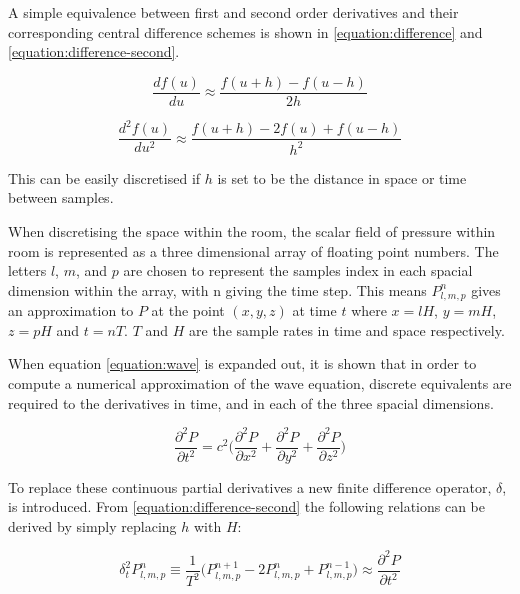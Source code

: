 \documentclass[12pt,a4paper]{report}
\begin{document}
A simple equivalence between first and second order derivatives and their corresponding central difference schemes is shown in \ref{equation:difference} and \ref{equation:difference-second}.

\begin{equation}
\label{equation:difference}
\frac{df(u)}{du} \approx \frac{f(u+h) - f(u-h)}{2h}
\end{equation}

\begin{equation}
\label{equation:difference-second}
\frac{d^{2}f(u)}{du^{2}} \approx \frac{f(u+h) - 2f(u) + f(u-h)}{h^{2}}
\end{equation}

This can be easily discretised if $h$ is set to be the distance in space or time between samples.

When discretising the space within the room, the scalar field of pressure within room is represented as a three dimensional array of floating point numbers. The letters $l$, $m$, and $p$ are chosen to represent the samples index in each spacial dimension within the array, with n giving the time step. This means $P_{l,m,p}^{n}$ gives an approximation to $P$ at the point $(x,y,z)$ at time $t$ where $x = lH$, $y = mH$, $z = pH$ and $t = nT$. $T$ and $H$ are the sample rates in time and space respectively.

When equation \ref{equation:wave} is expanded out, it is shown that in order to compute a numerical approximation of the wave equation, discrete equivalents are required to the derivatives in time, and in each of the three spacial dimensions.

\begin{equation}
\label{equation:wave-expanded}
\frac{{\partial ^2 P}}{{\partial t^2 }} = c^2 \Bigg( \frac{\partial ^2 P}{\partial x^2 } + \frac{\partial ^2 P}{\partial y^2 }  + \frac{\partial ^2 P}{\partial z^2 } \Bigg)
\end{equation}

To replace these continuous partial derivatives a new finite difference operator, $\delta$, is introduced. From \ref{equation:difference-second} the following relations can be derived by simply replacing $h$ with $H$:

\begin{equation}
\label{equation:part1}
\delta_{t}^{2} P_{l,m,p}^{n} \equiv \frac{1}{T^{2}} \Big(P_{l,m,p}^{n+1} - 2 P_{l,m,p}^{n} + P_{l,m,p}^{n-1}\Big) \approx \frac{{\partial ^2 P}}{{\partial t^2 }}
\end{equation}
\end{document}
